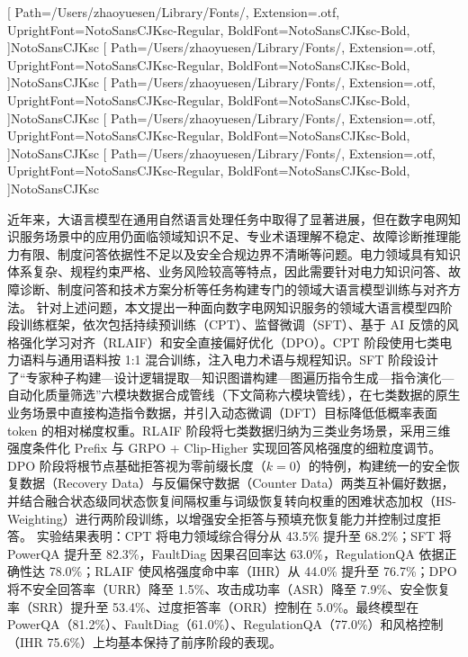 \documentclass[fontset=fandol,type=master,campus=shenzhen,etitleauto=true]{hithesisbook}
\begin{document}
\setCJKfallbackfamilyfont{\CJKrmdefault}[
  Path=/Users/zhaoyuesen/Library/Fonts/,
  Extension=.otf,
  UprightFont=NotoSansCJKsc-Regular,
  BoldFont=NotoSansCJKsc-Bold,
]{NotoSansCJKsc}
[
  Path=/Users/zhaoyuesen/Library/Fonts/,
  Extension=.otf,
  UprightFont=NotoSansCJKsc-Regular,
  BoldFont=NotoSansCJKsc-Bold,
]{NotoSansCJKsc}
[
  Path=/Users/zhaoyuesen/Library/Fonts/,
  Extension=.otf,
  UprightFont=NotoSansCJKsc-Regular,
  BoldFont=NotoSansCJKsc-Bold,
]{NotoSansCJKsc}
[
  Path=/Users/zhaoyuesen/Library/Fonts/,
  Extension=.otf,
  UprightFont=NotoSansCJKsc-Regular,
  BoldFont=NotoSansCJKsc-Bold,
]{NotoSansCJKsc}
[
  Path=/Users/zhaoyuesen/Library/Fonts/,
  Extension=.otf,
  UprightFont=NotoSansCJKsc-Regular,
  BoldFont=NotoSansCJKsc-Bold,
]{NotoSansCJKsc}
\frontmatter

\begin{cabstract}
近年来，大语言模型在通用自然语言处理任务中取得了显著进展，但在数字电网知识服务场景中的应用仍面临领域知识不足、专业术语理解不稳定、故障诊断推理能力有限、制度问答依据性不足以及安全合规边界不清晰等问题。电力领域具有知识体系复杂、规程约束严格、业务风险较高等特点，因此需要针对电力知识问答、故障诊断、制度问答和技术方案分析等任务构建专门的领域大语言模型训练与对齐方法。
针对上述问题，本文提出一种面向数字电网知识服务的领域大语言模型四阶段训练框架，依次包括持续预训练（CPT）、监督微调（SFT）、基于 AI 反馈的风格强化学习对齐（RLAIF）和安全直接偏好优化（DPO）。CPT 阶段使用七类电力语料与通用语料按 1:1 混合训练，注入电力术语与规程知识。SFT 阶段设计了“专家种子构建—设计逻辑提取—知识图谱构建—图遍历指令生成—指令演化—自动化质量筛选”六模块数据合成管线（下文简称六模块管线），在七类数据的原生业务场景中直接构造指令数据，并引入动态微调（DFT）目标降低低概率表面 token 的相对梯度权重。RLAIF 阶段将七类数据归纳为三类业务场景，采用三维强度条件化 Prefix 与 GRPO + Clip-Higher 实现回答风格强度的细粒度调节。DPO 阶段将根节点基础拒答视为零前缀长度（$k=0$）的特例，构建统一的安全恢复数据（Recovery Data）与反偏保守数据（Counter Data）两类互补偏好数据，并结合融合状态级同状态恢复间隔权重与词级恢复转向权重的困难状态加权（HS-Weighting）进行两阶段训练，以增强安全拒答与预填充恢复能力并控制过度拒答。
实验结果表明：CPT 将电力领域综合得分从 43.5\% 提升至 68.2\%；SFT 将 PowerQA 提升至 82.3\%，FaultDiag 因果召回率达 63.0\%，RegulationQA 依据正确性达 78.0\%；RLAIF 使风格强度命中率（IHR）从 44.0\% 提升至 76.7\%；DPO 将不安全回答率（URR）降至 1.5\%、攻击成功率（ASR）降至 7.9\%、安全恢复率（SRR）提升至 53.4\%、过度拒答率（ORR）控制在 5.0\%。最终模型在 PowerQA（81.2\%）、FaultDiag（61.0\%）、RegulationQA（77.0\%）和风格控制（IHR 75.6\%）上均基本保持了前序阶段的表现。
\end{cabstract}
\end{document}

